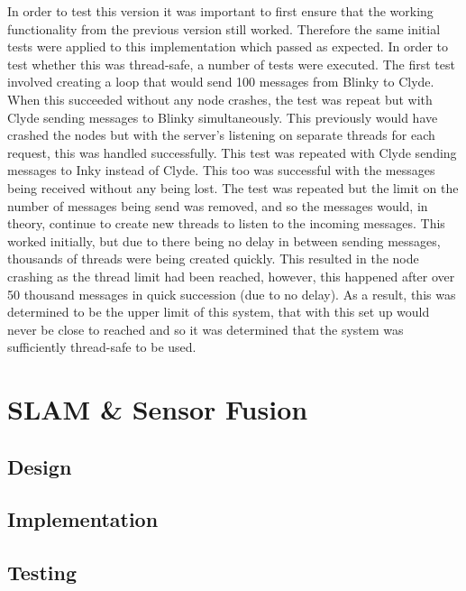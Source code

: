 In order to test this version it was important to first ensure that the 
working functionality from the previous version still worked. Therefore 
the same initial tests were applied to this implementation which passed 
as expected. In order to test whether this was thread-safe, a number of 
tests were executed. The first test involved creating a loop that would 
send 100 messages from Blinky to Clyde. When this succeeded without any 
node crashes, the test was repeat but with Clyde sending messages to Blinky 
simultaneously. This previously would have crashed the nodes but with the 
server's listening on separate threads for each request, this was handled 
successfully. This test was repeated with Clyde sending messages to Inky 
instead of Clyde. This too was successful with the messages being received 
without any being lost. The test was repeated but the limit on the number of 
messages being send was removed, and so the messages would, in theory, 
continue to create new threads to listen to the incoming messages. This 
worked initially, but due to there being no delay in between sending messages, 
thousands of threads were being created quickly. This resulted in the node 
crashing as the thread limit had been reached, however, this happened after 
over 50 thousand messages in quick succession (due to no delay). As a result, 
this was determined to be the upper limit of this system, that with this set 
up would never be close to reached and so it was determined that the system 
was sufficiently thread-safe to be used. 


\section{SLAM \& Sensor Fusion}\label{soft/SLAM}

\subsection{Design}\label{soft/SLAM/design}

\subsection{Implementation}\label{soft/SLAM/impl}

\subsection{Testing}\label{soft/SLAM/test}



